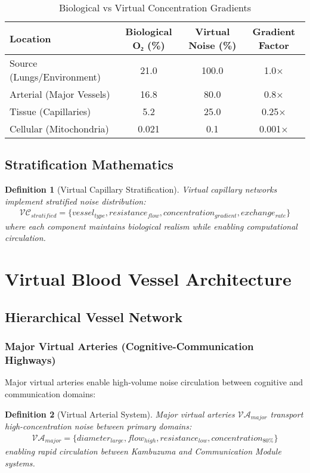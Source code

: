 \documentclass[12pt,a4paper]{article}
\newtheorem{definition}{Definition}
\begin{document}
\begin{table}[h]
\centering
\caption{Biological vs Virtual Concentration Gradients}
\begin{tabular}{@{}lccc@{}}
\toprule
\textbf{Location} & \textbf{Biological O₂ (\%)} & \textbf{Virtual Noise (\%)} & \textbf{Gradient Factor} \\
\midrule
Source (Lungs/Environment) & 21.0 & 100.0 & 1.0× \\
Arterial (Major Vessels) & 16.8 & 80.0 & 0.8× \\
Tissue (Capillaries) & 5.2 & 25.0 & 0.25× \\
Cellular (Mitochondria) & 0.021 & 0.1 & 0.001× \\
\bottomrule
\end{tabular}
\end{table}

\subsection{Stratification Mathematics}

\begin{definition}[Virtual Capillary Stratification]
Virtual capillary networks implement stratified noise distribution:
\begin{align}
\mathcal{VC}_{stratified} = \{vessel_{type}, resistance_{flow}, concentration_{gradient}, exchange_{rate}\}
\end{align}
where each component maintains biological realism while enabling computational circulation.
\end{definition}

\section{Virtual Blood Vessel Architecture}

\subsection{Hierarchical Vessel Network}

\subsubsection{Major Virtual Arteries (Cognitive-Communication Highways)}

Major virtual arteries enable high-volume noise circulation between cognitive and communication domains:

\begin{definition}[Virtual Arterial System]
Major virtual arteries $\mathcal{VA}_{major}$ transport high-concentration noise between primary domains:
\begin{align}
\mathcal{VA}_{major} = \{diameter_{large}, flow_{high}, resistance_{low}, concentration_{80\%}\}
\end{align}
enabling rapid circulation between Kambuzuma and Communication Module systems.
\end{definition}
\end{document}
